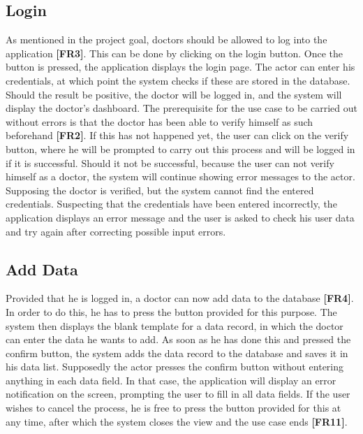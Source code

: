 \subsection{Login}
As mentioned in the project goal, doctors should be allowed to log into the application \textbf{[FR3]}. This can be done by clicking on the login button. Once the button is pressed, the application displays the login page. The actor can enter his credentials, at which point the system checks if these are stored in the database. Should the result be positive, the doctor will be logged in, and the system will display the doctor's dashboard. The prerequisite for the use case to be carried out without errors is that the doctor has been able to verify himself as such beforehand \textbf{[FR2]}. If this has not happened yet, the user can click on the verify button, where he will be prompted to carry out this process and will be logged in if it is successful. Should it not be successful, because the user can not verify himself as a doctor, the system will continue showing error messages to the actor. Supposing the doctor is verified, but the system cannot find the entered credentials. Suspecting that the credentials have been entered incorrectly, the application displays an error message and the user is asked to check his user data and try again after correcting possible input errors.

\subsection{Add Data}
Provided that he is logged in, a doctor can now add data to the database \textbf{[FR4]}. In order to do this, he has to press the button provided for this purpose. The system then displays the blank template for a data record, in which the doctor can enter the data he wants to add. As soon as he has done this and pressed the confirm button, the system adds the data record to the database and saves it in his data list. Supposedly the actor presses the confirm button without entering anything in each data field. In that case, the application will display an error notification on the screen, prompting the user to fill in all data fields. If the user wishes to cancel the process, he is free to press the button provided for this at any time, after which the system closes the view and the use case ends \textbf{[FR11]}. 

